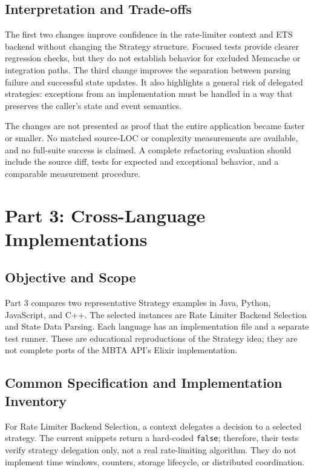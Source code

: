 \documentclass[11pt,a4paper]{article}
\newcommand{\code}[1]{\texttt{#1}}
\begin{document}
\subsection{Interpretation and Trade-offs}
The first two changes improve confidence in the rate-limiter context and ETS backend without changing the Strategy structure. Focused tests provide clearer regression checks, but they do not establish behavior for excluded Memcache or integration paths. The third change improves the separation between parsing failure and successful state updates. It also highlights a general risk of delegated strategies: exceptions from an implementation must be handled in a way that preserves the caller's state and event semantics.

The changes are not presented as proof that the entire application became faster or smaller. No matched source-LOC or complexity measurements are available, and no full-suite success is claimed. A complete refactoring evaluation should include the source diff, tests for expected and exceptional behavior, and a comparable measurement procedure.


\section{Part 3: Cross-Language Implementations}
\subsection{Objective and Scope}
Part 3 compares two representative Strategy examples in Java, Python, JavaScript, and C++. The selected instances are Rate Limiter Backend Selection and State Data Parsing. Each language has an implementation file and a separate test runner. These are educational reproductions of the Strategy idea; they are not complete ports of the MBTA API's Elixir implementation.

\subsection{Common Specification and Implementation Inventory}
For Rate Limiter Backend Selection, a context delegates a decision to a selected strategy. The current snippets return a hard-coded \code{false}; therefore, their tests verify strategy delegation only, not a real rate-limiting algorithm. They do not implement time windows, counters, storage lifecycle, or distributed coordination.
\end{document}

